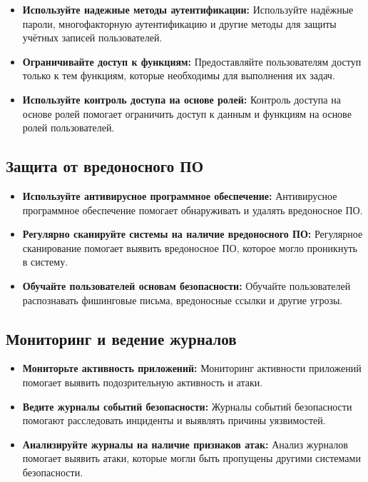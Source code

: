 \documentclass[a4paper,12pt]{diplom}
\begin{document}
	 \begin{itemize}
	 	\item \textbf{Используйте надежные методы аутентификации:} Используйте надёжные пароли, многофакторную аутентификацию и другие методы для защиты учётных записей пользователей.
	 	\item \textbf{Ограничивайте доступ к функциям:} Предоставляйте пользователям доступ только к тем функциям, которые необходимы для выполнения их задач.
	 	\item \textbf{Используйте контроль доступа на основе ролей:} Контроль доступа на основе ролей помогает ограничить доступ к данным и функциям на основе ролей пользователей. 
	 \end{itemize}
	 
	 \subsection{Защита от вредоносного ПО}
	 
	 \begin{itemize}
	 	\item \textbf{Используйте антивирусное программное обеспечение:} Антивирусное программное обеспечение помогает обнаруживать и удалять вредоносное ПО.
	 	\item \textbf{Регулярно сканируйте системы на наличие вредоносного ПО:} Регулярное сканирование помогает выявить вредоносное ПО, которое могло проникнуть в систему.
	 	\item \textbf{Обучайте пользователей основам безопасности:} Обучайте пользователей распознавать фишинговые письма, вредоносные ссылки и другие угрозы.
	 \end{itemize}
	 
	 \subsection{Мониторинг и ведение журналов}
	 
	 \begin{itemize}
	 	\item \textbf{Мониторьте активность приложений:} Мониторинг активности приложений помогает выявить подозрительную активность и атаки. 
	 	\item \textbf{Ведите журналы событий безопасности:} Журналы событий безопасности помогают расследовать инциденты и выявлять причины уязвимостей.
	 	\item \textbf{Анализируйте журналы на наличие признаков атак:} Анализ журналов помогает выявить атаки, которые могли быть пропущены другими системами безопасности.
	 \end{itemize}
	 
\end{document}
